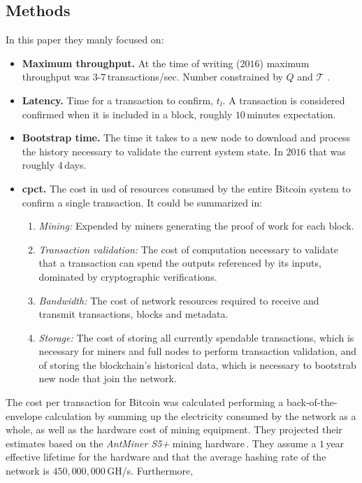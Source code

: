 \documentclass[USenglish]{uit-thesis}
\begin{document}
\subsection{Methods}
In this paper they manly focused on:
\begin{itemize}[noitemsep]
	\item \textbf{Maximum throughput.} At the time of writing ($2016$) maximum
	throughput was $3$-$7$\,transactions/sec. Number constrained by
	$Q$ and $\mathcal{T}$ .
	\item \textbf{Latency.} Time for a transaction to confirm, $t_l$. A transaction
	is considered confirmed when it is included in a block, roughly $10$\,minutes
	expectation.
	\item \textbf{Bootstrap time.} The time it takes to a new node to download and
	process the history necessary to validate the current system
	state. In $2016$ that was roughly $4$\,days. 
	\item \textbf{\gls{cpct}.} The cost in \gls{usd} of resources consumed
	by the entire Bitcoin system to confirm a single transaction. It could be
	summarized in:
	\begin{enumerate}
		\item \emph{Mining:} Expended by miners generating the proof of work
		for each block.
		\item \emph{Transaction validation:} The cost of computation necessary
		to validate that a transaction can spend the outputs referenced by its inputs,
		dominated by cryptographic verifications.
		\item \emph{Bandwidth:} The cost of network resources required to receive
		and transmit transactions, blocks and metadata.
		\item \emph{Storage:} The cost of storing all currently spendable
		transactions, which is necessary for miners and full nodes to perform
		transaction validation, and of storing the blockchain's historical data,
		which is necessary to bootstrab new node that join the network.
	\end{enumerate}
\end{itemize}
The cost per transaction for Bitcoin was calculated performing a
back-of-the-envelope calculation by summing up the electricity
consumed by the network as a whole, as well as the hardware cost
of mining equipment. They projected their estimates based on the
\emph{AntMiner S5+} mining hardware\,\cite{mining_hw}. They assume
a $1$\,year effective lifetime for the hardware and that the average
hashing rate of the network is $450,000,000$\,GH/s. Furthermore,
\end{document}
